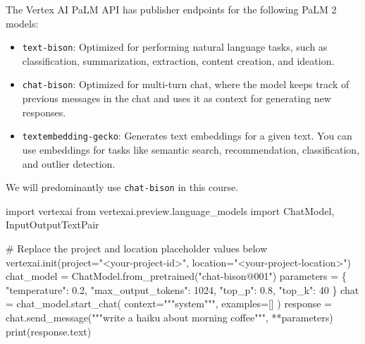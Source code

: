 \documentclass[
  letterpaper,
  DIV=11,
  numbers=noendperiod]{scrreprt}
\newenvironment{Shaded}{\begin{snugshade}}{\end{snugshade}}
\newcommand{\BuiltInTok}[1]{\textcolor[rgb]{0.00,0.23,0.31}{#1}}
\newcommand{\CommentTok}[1]{\textcolor[rgb]{0.37,0.37,0.37}{#1}}
\newcommand{\DecValTok}[1]{\textcolor[rgb]{0.68,0.00,0.00}{#1}}
\newcommand{\FloatTok}[1]{\textcolor[rgb]{0.68,0.00,0.00}{#1}}
\newcommand{\ImportTok}[1]{\textcolor[rgb]{0.00,0.46,0.62}{#1}}
\newcommand{\NormalTok}[1]{\textcolor[rgb]{0.00,0.23,0.31}{#1}}
\newcommand{\OperatorTok}[1]{\textcolor[rgb]{0.37,0.37,0.37}{#1}}
\newcommand{\StringTok}[1]{\textcolor[rgb]{0.13,0.47,0.30}{#1}}
\begin{document}
The Vertex AI PaLM API has publisher endpoints for the following PaLM 2
models:

\begin{itemize}
\item
  \texttt{text-bison}: Optimized for performing natural language tasks,
  such as classification, summarization, extraction, content creation,
  and ideation.
\item
  \texttt{chat-bison}: Optimized for multi-turn chat, where the model
  keeps track of previous messages in the chat and uses it as context
  for generating new responses.
\item
  \texttt{textembedding-gecko}: Generates text embeddings for a given
  text. You can use embeddings for tasks like semantic search,
  recommendation, classification, and outlier detection.
\end{itemize}

We will predominantly use \texttt{chat-bison} in this course.

\begin{Shaded}
\begin{Highlighting}[]
\ImportTok{import}\NormalTok{ vertexai}
\ImportTok{from}\NormalTok{ vertexai.preview.language\_models }\ImportTok{import}\NormalTok{ ChatModel, InputOutputTextPair}

\CommentTok{\# Replace the project and location placeholder values below}
\NormalTok{vertexai.init(project}\OperatorTok{=}\StringTok{"\textless{}your{-}project{-}id\textgreater{}"}\NormalTok{, location}\OperatorTok{=}\StringTok{"\textless{}your{-}project{-}location\textgreater{}"}\NormalTok{)}
\NormalTok{chat\_model }\OperatorTok{=}\NormalTok{ ChatModel.from\_pretrained(}\StringTok{"chat{-}bison@001"}\NormalTok{)}
\NormalTok{parameters }\OperatorTok{=}\NormalTok{ \{}
    \StringTok{"temperature"}\NormalTok{: }\FloatTok{0.2}\NormalTok{,}
    \StringTok{"max\_output\_tokens"}\NormalTok{: }\DecValTok{1024}\NormalTok{,}
    \StringTok{"top\_p"}\NormalTok{: }\FloatTok{0.8}\NormalTok{,}
    \StringTok{"top\_k"}\NormalTok{: }\DecValTok{40}
\NormalTok{\}}
\NormalTok{chat }\OperatorTok{=}\NormalTok{ chat\_model.start\_chat(}
\NormalTok{    context}\OperatorTok{=}\StringTok{"""system"""}\NormalTok{,}
\NormalTok{    examples}\OperatorTok{=}\NormalTok{[]}
\NormalTok{)}
\NormalTok{response }\OperatorTok{=}\NormalTok{ chat.send\_message(}\StringTok{"""write a haiku about morning coffee"""}\NormalTok{, }\OperatorTok{**}\NormalTok{parameters)}
\BuiltInTok{print}\NormalTok{(response.text)}
\end{Highlighting}
\end{Shaded}
\end{document}
